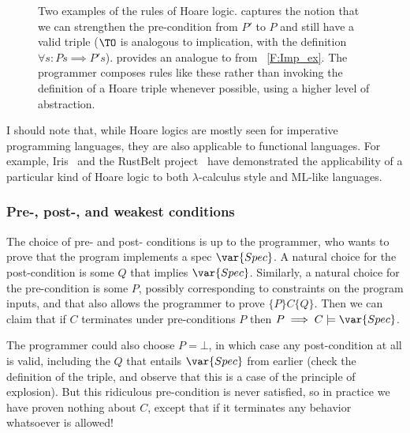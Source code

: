 \begin{figure}
    \centering
    \caption{Two examples of the rules of Hoare logic.
     captures the notion that we can strengthen the
    pre-condition from \(P'\) to \(P\) and still have a valid triple (\(\TO\) is
    analogous to implication, with the definition \(\forall s: P s \implies P'
    s\)).  provides an analogue to  from
    \figurename~\ref{F:Imp_ex}. The programmer composes rules like these rather
    than invoking the definition of a Hoare triple whenever possible, using a
    higher level of abstraction.}\label{F:Hoare_ex}
\end{figure}

I should note that, while Hoare logics are mostly seen for imperative
programming languages, they are also applicable to functional languages. For
example, Iris~\cite[\S 5.1]{Krebbers_2017b} and the RustBelt project~\cite[\S
3.2, esp. \figurename~3]{Jung_2018a} have demonstrated the applicability of a
particular kind of Hoare logic to both \(\lambda\)-calculus style and ML-like
languages.

\subsubsection{Pre-, post-, and weakest conditions}

The choice of pre- and post- conditions is up to the programmer, who wants to
prove that the program implements a spec \(\var{Spec}\). A natural choice for
the post-condition is some \(Q\) that implies \(\var{Spec}\). Similarly, a
natural choice for the pre-condition is some \(P\), possibly corresponding to
constraints on the program inputs, and that also allows the programmer to prove
\(\{P\} C \{Q\}\). Then we can claim that if \(C\) terminates under
pre-conditions \(P\) then \(P \implies C \models \var{Spec}\).

The programmer could also choose \(P = \bot\), in which case any post-condition
at all is valid, including the \(Q\) that entails \(\var{Spec}\) from earlier
(check the definition of the triple, and observe that this is a case of the
principle of explosion). But this ridiculous pre-condition is never satisfied,
so in practice we have proven nothing about \(C\), except that if it terminates
any behavior whatsoever is allowed!

